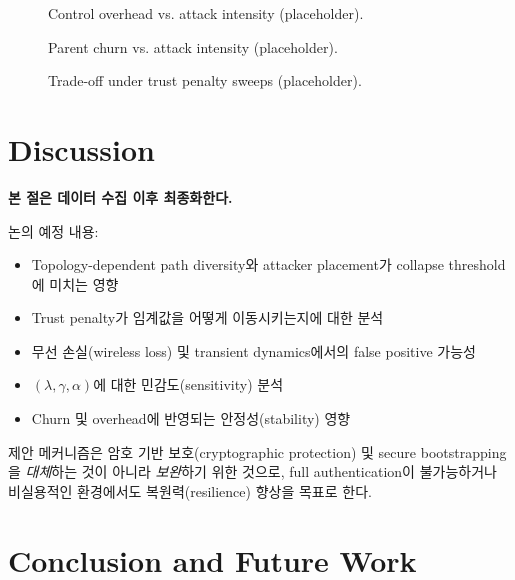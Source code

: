 \documentclass[11pt,a4paper]{article}
\begin{document}
\begin{figure}[t]
  \centering
  \caption{Control overhead vs. attack intensity (placeholder).}
  \label{fig:overhead}
\end{figure}

\begin{figure}[t]
  \centering
  \caption{Parent churn vs. attack intensity (placeholder).}
  \label{fig:parent-switch}
\end{figure}

\begin{figure}[t]
  \centering
  \caption{Trade-off under trust penalty sweeps (placeholder).}
  \label{fig:lambda-tradeoff}
\end{figure}

\section{Discussion}
\label{sec:discussion}

\noindent\textbf{본 절은 데이터 수집 이후 최종화한다.}

논의 예정 내용:
\begin{itemize}[leftmargin=*]
  \item Topology-dependent path diversity와 attacker placement가 collapse threshold에 미치는 영향
  \item Trust penalty가 임계값을 어떻게 이동시키는지에 대한 분석
  \item 무선 손실(wireless loss) 및 transient dynamics에서의 false positive 가능성
  \item $(\lambda,\gamma,\alpha)$에 대한 민감도(sensitivity) 분석
  \item Churn 및 overhead에 반영되는 안정성(stability) 영향
\end{itemize}

제안 메커니즘은 암호 기반 보호(cryptographic protection) 및 secure bootstrapping을 \emph{대체}하는 것이 아니라 \emph{보완}하기 위한 것으로, full authentication이 불가능하거나 비실용적인 환경에서도 복원력(resilience) 향상을 목표로 한다.

\section{Conclusion and Future Work}
\label{sec:conclusion}
\end{document}
